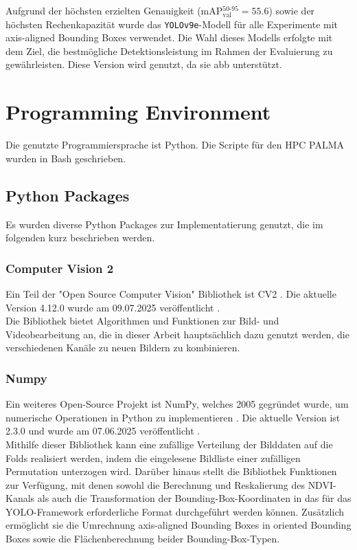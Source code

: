 Aufgrund der höchsten erzielten Genauigkeit (\acrshort{mAP}$_{\text{val}}^{50\text{-}95} = 55.6$) sowie der höchsten Rechenkapazität wurde das \texttt{YOLOv9e}-Modell für alle Experimente mit axis-aligned Bounding Boxes verwendet. Die Wahl dieses Modells erfolgte mit dem Ziel, die bestmögliche Detektionsleistung im Rahmen der Evaluierung zu gewährleisten. Diese Version wird genutzt, da sie \acrlong{abb} unterstützt.

\section{Programming Environment}
Die genutzte Programmiersprache ist Python. Die Scripte für den \acrshort{HPC} \acrshort{PALMA} wurden in Bash geschrieben.

\subsection{Python Packages}
Es wurden diverse Python Packages zur Implementatierung genutzt, die im folgenden kurz beschrieben werden. 
\subsubsection{Computer Vision 2}
Ein Teil der "Open Source Computer Vision" Bibliothek ist \Acrfull{CV2} \cite{opencv_about}. Die aktuelle Version 4.12.0 wurde am 09.07.2025 veröffentlicht \cite{opencv_release}. \\
Die Bibliothek bietet Algorithmen und Funktionen zur Bild- und Videobearbeitung an, die in dieser Arbeit hauptsächlich dazu genutzt werden, die verschiedenen Kanäle zu neuen Bildern zu kombinieren.
\subsubsection{Numpy}
Ein weiteres Open-Source Projekt ist NumPy, welches 2005 gegründet wurde, um numerische Operationen in Python zu implementieren \cite{numpy_about}. Die aktuelle Version ist 2.3.0 und wurde am 07.06.2025 veröffentlicht \cite{numpy_main_web}. \\
Mithilfe dieser Bibliothek kann eine zufällige Verteilung der Bilddaten auf die Folds realisiert werden, indem die eingelesene Bildliste einer zufälligen Permutation unterzogen wird. Darüber hinaus stellt die Bibliothek Funktionen zur Verfügung, mit denen sowohl die Berechnung und Reskalierung des \acrshort{NDVI}-Kanals als auch die Transformation der Bounding-Box-Koordinaten in das für das \acrshort{YOLO}-Framework erforderliche Format durchgeführt werden können. Zusätzlich ermöglicht sie die Umrechnung axis-aligned Bounding Boxes in oriented Bounding Boxes sowie die Flächenberechnung beider Bounding-Box-Typen.
